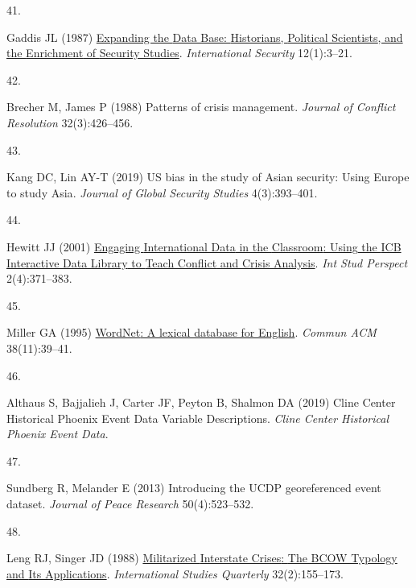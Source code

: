 \documentclass{article}
\newlength{\cslhangindent}
\newlength{\csllabelwidth}
\newlength{\cslentryspacingunit} %
\newenvironment{CSLReferences}[2] %
 {%
  \setlength{\parindent}{0pt}
  \ifodd #1
  \let\oldpar\par
  \def\par{\hangindent=\cslhangindent\oldpar}
  \fi
  \setlength{\parskip}{#2\cslentryspacingunit}
 }%
 {}
\newcommand{\CSLLeftMargin}[1]{\parbox[t]{\csllabelwidth}{#1}}
\newcommand{\CSLRightInline}[1]{\parbox[t]{\linewidth - \csllabelwidth}{#1}\break}
\begin{document}
\begin{CSLReferences}{0}{0}
\leavevmode{}%
\CSLLeftMargin{41. }%
\CSLRightInline{Gaddis JL (1987)
\href{https://doi.org/10.2307/2538915}{Expanding the {Data Base}:
{Historians}, {Political Scientists}, and the {Enrichment} of {Security
Studies}}. \emph{International Security} 12(1):3--21.}

\leavevmode{}%
\CSLLeftMargin{42. }%
\CSLRightInline{Brecher M, James P (1988) Patterns of crisis management.
\emph{Journal of Conflict Resolution} 32(3):426--456.}

\leavevmode{}%
\CSLLeftMargin{43. }%
\CSLRightInline{Kang DC, Lin AY-T (2019) {US} bias in the study of
{Asian} security: {Using Europe} to study {Asia}. \emph{Journal of
Global Security Studies} 4(3):393--401.}

\leavevmode{}%
\CSLLeftMargin{44. }%
\CSLRightInline{Hewitt JJ (2001)
\href{https://doi.org/10.1111/1528-3577.00066}{Engaging {International
Data} in the {Classroom}: {Using} the {ICB Interactive Data Library} to
{Teach Conflict} and {Crisis Analysis}}. \emph{Int Stud Perspect}
2(4):371--383.}

\leavevmode{}%
\CSLLeftMargin{45. }%
\CSLRightInline{Miller GA (1995)
\href{https://doi.org/10.1145/219717.219748}{{WordNet}: A lexical
database for {English}}. \emph{Commun ACM} 38(11):39--41.}

\leavevmode{}%
\CSLLeftMargin{46. }%
\CSLRightInline{Althaus S, Bajjalieh J, Carter JF, Peyton B, Shalmon DA
(2019) Cline {Center Historical Phoenix Event Data Variable
Descriptions}. \emph{Cline Center Historical Phoenix Event Data}.}

\leavevmode{}%
\CSLLeftMargin{47. }%
\CSLRightInline{Sundberg R, Melander E (2013) Introducing the {UCDP}
georeferenced event dataset. \emph{Journal of Peace Research}
50(4):523--532.}

\leavevmode{}%
\CSLLeftMargin{48. }%
\CSLRightInline{Leng RJ, Singer JD (1988)
\href{https://doi.org/10.2307/2600625}{Militarized {Interstate Crises}:
{The BCOW Typology} and {Its Applications}}. \emph{International Studies
Quarterly} 32(2):155--173.}


\end{CSLReferences}
\end{document}
